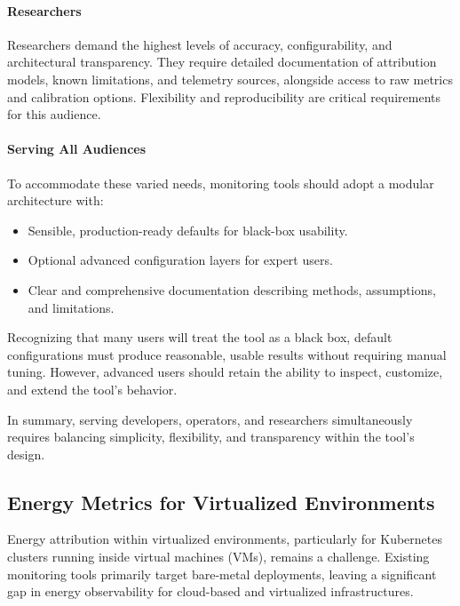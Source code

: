 \paragraph{Researchers}
Researchers demand the highest levels of accuracy, configurability, and architectural transparency. They require detailed documentation of attribution models, known limitations, and telemetry sources, alongside access to raw metrics and calibration options. Flexibility and reproducibility are critical requirements for this audience.

\paragraph{Serving All Audiences}
To accommodate these varied needs, monitoring tools should adopt a modular architecture with:
\begin{itemize}
    \item Sensible, production-ready defaults for black-box usability.
    \item Optional advanced configuration layers for expert users.
    \item Clear and comprehensive documentation describing methods, assumptions, and limitations.
\end{itemize}

Recognizing that many users will treat the tool as a black box, default configurations must produce reasonable, usable results without requiring manual tuning. However, advanced users should retain the ability to inspect, customize, and extend the tool’s behavior.

In summary, serving developers, operators, and researchers simultaneously requires balancing simplicity, flexibility, and transparency within the tool’s design.

\subsection{Energy Metrics for Virtualized Environments}
\label{sec:future-virtualized-environments}

Energy attribution within virtualized environments, particularly for Kubernetes clusters running inside virtual machines (VMs), remains a challenge. Existing monitoring tools primarily target bare-metal deployments, leaving a significant gap in energy observability for cloud-based and virtualized infrastructures.

